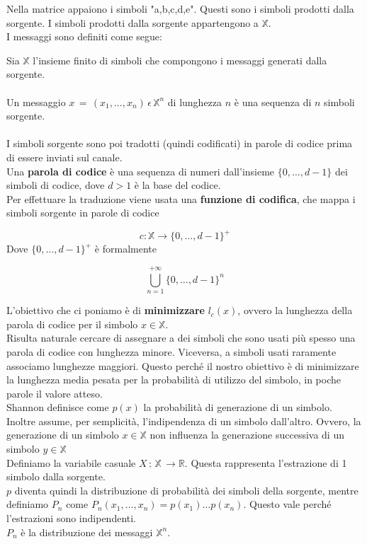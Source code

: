 \documentclass[12pt]{report}
\begin{document}
    \noindent Nella matrice appaiono i simboli "a,b,c,d,e". Questi sono i simboli prodotti dalla sorgente. I simboli prodotti dalla sorgente appartengono a $\mathbb{X}$.
    \\
    I messaggi sono definiti come segue:
    \vspace{5px}

    \noindent Sia $\mathbb{X}$ l'insieme finito di simboli che compongono i messaggi generati dalla sorgente. \\ \\
    Un messaggio $x \, = \,(x_1,...,x_n)\, \epsilon \, \mathbb{X}^n$ di lunghezza $n$ è una sequenza di $n$ simboli sorgente.
    \\ \\
    I simboli sorgente sono poi tradotti (quindi codificati) in parole di codice prima di essere inviati sul canale. \\
    Una \textbf{parola di codice} è una sequenza di numeri dall'insieme $\{0,\dots,d-1\}$ dei simboli di codice, dove $d > 1$ è la base del codice.\\
    Per effettuare la traduzione viene usata una \textbf{funzione di codifica}, che mappa i simboli sorgente in parole di codice

    $$c : \mathbb{X} \rightarrow \{0,...,d-1\}^+$$
    Dove $\{0,\dots,d-1\}^+$ è formalmente

    $$\bigcup_{n=1}^{+\infty}\{0,\dots,d-1\}^n$$

    \noindent L'obiettivo che ci poniamo è di \textbf{minimizzare} $l_c(x)$, ovvero la lunghezza della parola di codice per il simbolo $x \in \mathbb{X}$. \\

    \noindent Risulta naturale cercare di assegnare a dei simboli che sono usati più spesso una parola di codice con lunghezza minore. Viceversa, a simboli usati raramente associamo lunghezze maggiori. Questo perché il nostro obiettivo è di minimizzare la lunghezza media pesata per la probabilità di utilizzo del simbolo, in poche parole il valore atteso. \\

    \noindent Shannon definisce come $p(x)$ la probabilità di generazione di un simbolo. Inoltre assume, per semplicità, l'indipendenza di un simbolo dall'altro. Ovvero, la generazione di un simbolo $x \in \mathbb{X}$ non influenza la generazione successiva di un simbolo $y \in \mathbb{X}$
    \\

    \noindent Definiamo la variabile casuale  $X\,:\, \mathbb{X} \, \rightarrow \mathbb{R}$. Questa rappresenta l'estrazione di 1 simbolo dalla sorgente. \\
    $p$ diventa quindi la distribuzione di probabilità dei simboli della sorgente, mentre definiamo $P_n$ come  $P_n(x_1,\dots,x_n) = p(x_1)\dots p(x_n)$. Questo vale perché l'estrazioni sono indipendenti. \\
    $P_n$ è la distribuzione dei messaggi $\mathbb{X}^n$. \\
\end{document}
